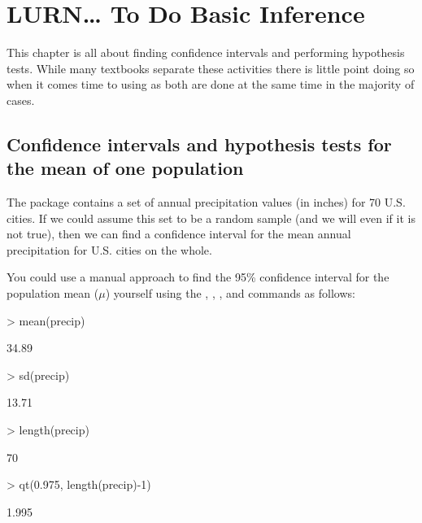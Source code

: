 



\chapter{LURN\ldots{} To Do Basic Inference} 
\label{BasicInference} 
 



 
This chapter is all about finding confidence intervals and performing hypothesis tests. While many textbooks separate these activities there is little point doing so when it comes time to using \R{} as both are done at the same time in the majority of cases. 
 
 
\section{Confidence intervals and hypothesis tests for the mean of one population} 
 
The  package contains a set of annual precipitation values (in inches) for 70 U.S. cities. If we could assume this set to be a random sample (and we will even if it is not true), then we can find a confidence interval for the mean annual precipitation for U.S. cities on the whole. 
 
You could use a manual approach to find the 95\% confidence interval for the population mean ($\mu$) yourself using the , , , and  commands as follows:  

\begin{Schunk}
\begin{Sinput}
> mean(precip) 
\end{Sinput}
\begin{Soutput}
[1] 34.89
\end{Soutput}
\begin{Sinput}
> sd(precip) 
\end{Sinput}
\begin{Soutput}
[1] 13.71
\end{Soutput}
\begin{Sinput}
> length(precip) 
\end{Sinput}
\begin{Soutput}
[1] 70
\end{Soutput}
\begin{Sinput}
> qt(0.975, length(precip)-1) 
\end{Sinput}
\begin{Soutput}
[1] 1.995
\end{Soutput}
\end{Schunk}

